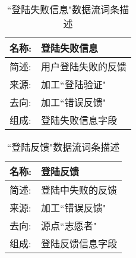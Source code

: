 \begin{table}[H]  
\caption{``登陆失败信息"数据流词条描述}  
\begin{center}  
    \begin{tabular}{l p{11cm}} 
        \hline
        \quad 名称:  &   登陆失败信息 \\
        \hline
        \quad 简述:  & 用户登陆失败的反馈 \\
        \hline
        \quad 来源:  & 加工``登陆验证" \\
        \hline
        \quad 去向:  & 加工``错误反馈" \\
        \hline
        \quad 组成:  & 登陆失败信息字段 \\
        \hline
    \end{tabular}
    \label{tab1}
\end{center}
\end{table}

\begin{table}[H]  
\caption{``登陆反馈"数据流词条描述}  
\begin{center}  
    \begin{tabular}{l p{11cm}} 
        \hline
        \quad 名称:  &   登陆反馈 \\
        \hline
        \quad 简述:  & 登陆中失败的反馈 \\
        \hline
        \quad 来源:  & 加工``错误反馈" \\
        \hline
        \quad 去向:  & 源点``志愿者" \\
        \hline
        \quad 组成:  & 登陆反馈信息字段 \\
        \hline
    \end{tabular}
    \label{tab1}
\end{center}
\end{table}



